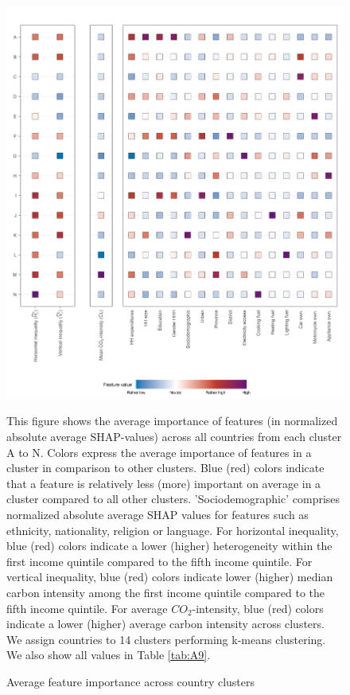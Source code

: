 \documentclass[12pt, a4paper]{article}
\newenvironment{subcaption}
{\strut
\vspace{-5pt}
\begin{minipage}[b]{0.9\textwidth}
  \hspace*{-\parindent}
  \footnotesize}
 {\end{minipage}}
\begin{document}
\begin{figure}[ht!]
    \centering
    \includegraphics{Figure 3/Figure_3}
    \caption{Average feature importance across country clusters}
    \label{fig:fig_3}
    \begin{subcaption}
    This figure shows the average importance of features (in normalized absolute average SHAP-values) across all countries from each cluster A to N. Colors express the average importance of features in a cluster in comparison to other clusters. Blue (red) colors indicate that a feature is relatively less (more) important on average in a cluster compared to all other clusters. 'Sociodemographic' comprises normalized absolute average SHAP values for features such as ethnicity, nationality, religion or language.
    For horizontal inequality, blue (red) colors indicate a lower (higher) heterogeneity within the first income quintile compared to the fifth income quintile. For vertical inequality, blue (red) colors indicate lower (higher) median carbon intensity among the first income quintile compared to the fifth income quintile. For average $CO_{2}$-intensity, blue (red) colors indicate a lower (higher) average carbon intensity across clusters. We assign countries to 14 clusters performing k-means clustering. We also show all values in Table \ref{tab:A9}.
    \end{subcaption}
\end{figure}
\end{document}
